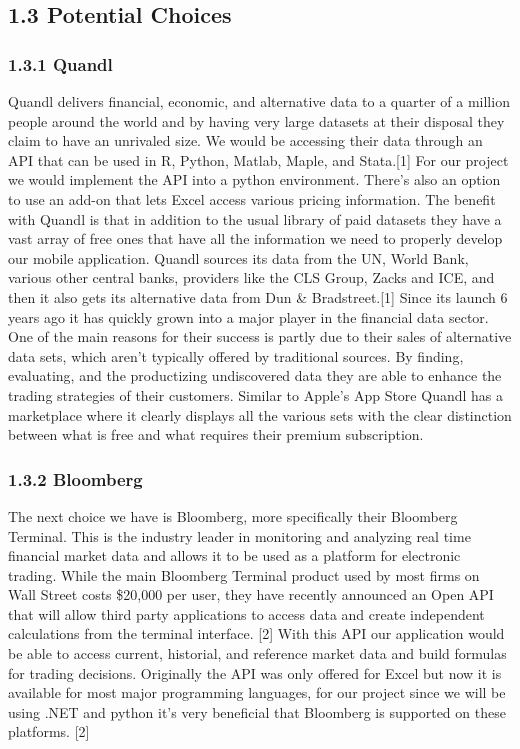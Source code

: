 \documentclass[onecolumn, draftclsnofoot,10pt, compsoc]{IEEEtran}
\begin{document}
\subsection{1.3 Potential Choices}

\subsubsection{1.3.1 Quandl}
Quandl delivers financial, economic, and alternative data to a quarter of a million people around the world and by having very large datasets at their disposal they claim to have an unrivaled size. We would be accessing their data through an API that can be used in R, Python, Matlab, Maple, and Stata.[1] For our project we would implement the API into a python environment. There’s also an option to use an add-on that lets Excel access various pricing information. The benefit with Quandl is that in addition to the usual library of paid datasets they have a vast array of free ones that have all the information we need to properly develop our mobile application. Quandl sources its data from the UN, World Bank, various other central banks, providers like the CLS Group, Zacks and ICE, and then it also gets its alternative data from Dun \& Bradstreet.[1] Since its launch 6 years ago it has quickly grown into a major player in the financial data sector. One of the main reasons for their success is partly due to their sales of alternative data sets, which aren’t typically offered by traditional sources. By finding, evaluating, and the productizing undiscovered data they are able to enhance the trading strategies of their customers. Similar to Apple’s App Store Quandl has a marketplace where it clearly displays all the various sets with the clear distinction between what is free and what requires their premium subscription. 

\subsubsection{1.3.2 Bloomberg}
The next choice we have is Bloomberg, more specifically their Bloomberg Terminal. This is the industry leader in monitoring and analyzing real time financial market data and allows it to be used as a platform for electronic trading. While the main Bloomberg Terminal product used by most firms on Wall Street costs \$20,000 per user, they have recently announced an Open API that will allow third party applications to access data and create independent calculations from the terminal interface. [2] With this API our application would be able to access current, historial, and reference market data and build formulas for trading decisions. Originally the API was only offered for Excel but now it is available for most major programming languages, for our project since we will be using .NET and python it’s very beneficial that Bloomberg is supported on these platforms. [2]
\end{document}
